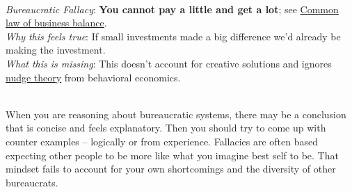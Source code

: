 



\ \\
\textit{Bureaucratic Fallacy}: 
\textbf{You cannot pay a little and get a lot}; see \href{https://en.wikipedia.org/wiki/Common_law_of_business_balance}{Common law of business balance}.   \\
\textit{Why this feels true}: If small investments made a big difference we'd already be making the investment.\\
\textit{What this is missing}: This doesn't account for creative solutions and ignores \href{https://en.wikipedia.org/wiki/Nudge_theory}{nudge theory} from behavioral economics. 

\ \\

When you are reasoning about bureaucratic systems, there may be a conclusion that is concise and feels explanatory. Then you should try to come up with counter examples -- logically or from experience.  Fallacies are often based expecting other people to be more like what you imagine best self to be. That mindset fails to account for your own shortcomings and the diversity of other bureaucrats. 

